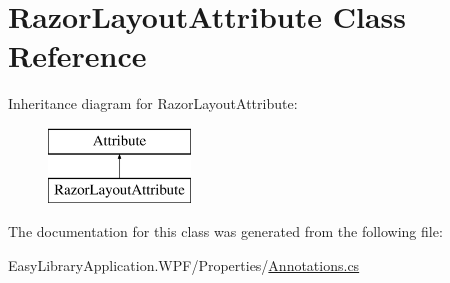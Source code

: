 \hypertarget{class_razor_layout_attribute}{}\section{Razor\+Layout\+Attribute Class Reference}
\label{class_razor_layout_attribute}
Inheritance diagram for Razor\+Layout\+Attribute\+:\begin{figure}[H]
\begin{center}
\leavevmode
\includegraphics[height=2.000000cm]{class_razor_layout_attribute}
\end{center}
\end{figure}


The documentation for this class was generated from the following file\+:\begin{DoxyCompactItemize}
\item 
Easy\+Library\+Application.\+W\+P\+F/\+Properties/\mbox{\hyperlink{_annotations_8cs}{Annotations.\+cs}}\end{DoxyCompactItemize}
